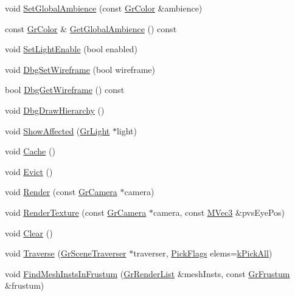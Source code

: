 \begin{CompactItemize}
void \hyperlink{class_gr_scene_d8cf055496150d2f331ef24cf74dc0b6}{SetGlobalAmbience} (const \hyperlink{class_gr_color}{GrColor} \&ambience)
\item 
const \hyperlink{class_gr_color}{GrColor} \& \hyperlink{class_gr_scene_59c6545b88059447aac8f9ca4d1c3bf2}{GetGlobalAmbience} () const 
\item 
void \hyperlink{class_gr_scene_1834cc42ace852985a396a950847a57e}{SetLightEnable} (bool enabled)
\item 
void \hyperlink{class_gr_scene_4221a4094e3df2199d1192b84d57f741}{DbgSetWireframe} (bool wireframe)
\item 
bool \hyperlink{class_gr_scene_1115b4bd5df43fe6c184aeea371bb3c4}{DbgGetWireframe} () const 
\item 
void \hyperlink{class_gr_scene_a48f857953dfa7af6103b4a9bf6ee7c6}{DbgDrawHierarchy} ()
\item 
void \hyperlink{class_gr_scene_121b1f76ae65b017b644f2748fd52b05}{ShowAffected} (\hyperlink{class_gr_light}{GrLight} $\ast$light)
\item 
void \hyperlink{class_gr_scene_d0b2a12e012faf97823cab5067eb4fb0}{Cache} ()
\item 
void \hyperlink{class_gr_scene_cb24d3dbe6ccb8f318934a381d440541}{Evict} ()
\item 
void \hyperlink{class_gr_scene_881037f45a998cb19df5256943f9b50f}{Render} (const \hyperlink{class_gr_camera}{GrCamera} $\ast$camera)
\item 
void \hyperlink{class_gr_scene_5e92ae713e6a097e7407cb82c9a45db7}{RenderTexture} (const \hyperlink{class_gr_camera}{GrCamera} $\ast$camera, const \hyperlink{class_m_vec3}{MVec3} \&pvsEyePos)
\item 
void \hyperlink{class_gr_scene_29e762ce8bc2054ff7564cbae4aafea5}{Clear} ()
\item 
void \hyperlink{class_gr_scene_bd77c55363f70fdc20c346976948ab18}{Traverse} (\hyperlink{class_gr_scene_traverser}{GrSceneTraverser} $\ast$traverser, \hyperlink{class_gr_scene_7645ba831bfac8f4543f59ff7b2c63bd}{PickFlags} elems=\hyperlink{class_gr_scene_a8cf807b21fc873fd6158af7ca6da3e5}{kPickAll})
\item 
void \hyperlink{class_gr_scene_5a2aeac93da5261846c53b92d7333025}{FindMeshInstsInFrustum} (\hyperlink{class_gr_render_list}{GrRenderList} \&meshInsts, const \hyperlink{class_gr_frustum}{GrFrustum} \&frustum)
\end{CompactItemize}
